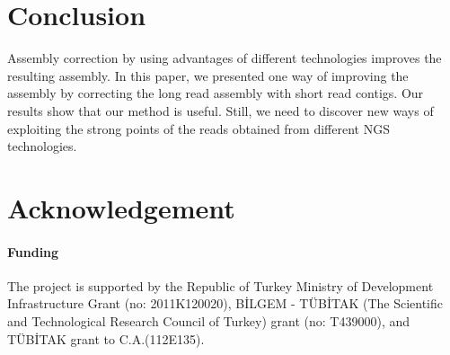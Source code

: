 \documentclass[12pt]{article}
\begin{document}
\section{Conclusion}
\label{conc}
Assembly correction by using advantages of different technologies improves the resulting assembly. In this paper, we presented one way of improving the assembly by correcting the long read assembly with short read contigs. Our results show that our method is useful. Still, we need to discover new ways of exploiting the strong points of the reads obtained from different NGS technologies.

\section*{Acknowledgement}
\paragraph{Funding\textcolon}
The project is supported by the Republic of Turkey Ministry of Development Infrastructure Grant (no: 2011K120020), B\.{I}LGEM \-- T\"{U}B\.{I}TAK (The Scientific and Technological Research Council of Turkey) grant (no: T439000), and T\"{U}B\.{I}TAK grant to C.A.(112E135).\\


%
%
%
%
%
%
%
%
%
\end{document}
